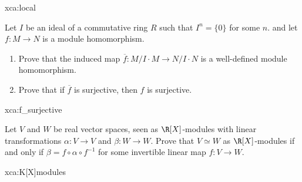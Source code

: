 \begin{sol}{xca:local}

\end{sol}

\begin{exercise}
\label{xca:f_surjective}
    Let $I$ be an ideal of a commutative ring $R$ such that $I^n=\{0\}$ for some $n$. 
    and let $f\colon M\to N$ is a module homomorphism.
    \begin{enumerate} 
    \item Prove that the induced map 
    $\overline{f}\colon M/I\cdot M\to N/I\cdot N$ is a well-defined module
    homomorphism. 
    \item Prove that if $\overline{f}$ is surjective, then $f$ is surjective.
    \end{enumerate}
\end{exercise}

\begin{sol}{xca:f_surjective}
\end{sol}

\begin{exercise}
\label{xca:K[X]modules}
    Let $V$ and $W$ be real vector spaces, seen as $\R[X]$-modules
    with linear transformations $\alpha\colon V\to V$ and $\beta\colon W\to W$. Prove
    that $V\simeq W$ as $\R[X]$-modules if and only if $\beta=f\circ \alpha\circ f^{-1}$ 
    for some invertible linear map $f\colon V\to W$. 
\end{exercise}

\begin{sol}{xca:K[X]modules}
\end{sol}

